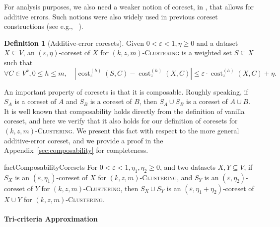 \documentclass[letterpaper,11pt]{article}
\theoremstyle{plain}
\theoremstyle{definition}
\newtheorem{definition}[theorem]{Definition}
\theoremstyle{remark}
\DeclareMathOperator{\cost}{cost}
\newcommand{\eps}{\varepsilon}
\newcommand{\ProblemName}[1]{\textsc{#1}}
\newcommand{\kzmC}{\ProblemName{$(k,z,m)$-Clustering}\xspace}
\begin{document}
For analysis purposes, we also need a weaker notion of coreset, in , that allows for additive errors. 
Such notions were also widely used in previous coreset constructions (see e.g., ~\cite{Cohen-addad2021New,Cohen-Addad22Towards,Braverman22Power,Huang2022Near-optimal}).




\begin{definition}[Additive-error coresets]
    \label{def:additive_coreset}
    Given $0<\eps<1, \eta\ge 0$ and a dataset $X\subseteq V$, an $(\eps,\eta)$-coreset of $X$ for \kzmC is a weighted set $S\subseteq X$ such that
    \begin{equation*}
        \forall C\in V^k, 0\le h\le m, \quad \left|\cost_z^{(h)}(S,C) - \cost_z^{(h)}(X,C)  \right|\le \eps\cdot \cost_z^{(h)}(X,C) + \eta.
    \end{equation*} 
\end{definition}

An important property of coresets is that it is composable.
Roughly speaking, if $S_A$ is a coreset of $A$ and $S_B$ is a coreset of $B$, then $S_A\cup S_B$ is a coreset of $A\cup B$. 
It is well known that composability holds directly from the definition of vanilla coreset,
and here we verify that it also holds for our definition of coresets for \kzmC.
We present this fact with respect to the more general additive-error coreset,
and we provide a proof in the Appendix~\ref{sec:composability} for completeness.

\begin{restatable}{fact}{ComposabilityCoresets}
    \label{fact:composability}
    For $0<\eps<1, \eta_1,\eta_2\ge 0$, and two datasets $X,Y\subseteq V$, if $S_{X}$ is an $(\eps,\eta_1)$-coreset of $X$ for \kzmC, and $S_{Y}$ is an $(\eps,\eta_2)$-coreset of $Y$ for \kzmC, then $S_X\cup S_Y$ is an $(\eps,\eta_1+\eta_2)$-coreset of $X\cup Y$ for \kzmC.
\end{restatable}



\paragraph{Tri-criteria Approximation}
\end{document}
